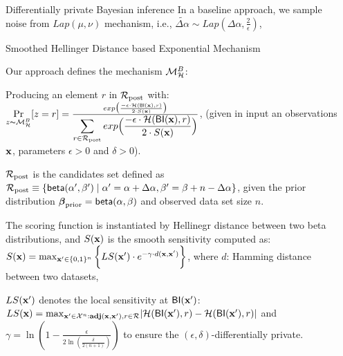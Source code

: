 \documentclass[final,hyperref={pdfpagelabels=false}]{beamer}
\begin{document}
\begin{frame}[t]
\begin{columns}[t]
\begin{column}{.485\textwidth}
\begin{block}{Differentially private Bayesian inference}
In a baseline approach, we sample noise from $Lap(\mu,\nu)$ mechanism, i.e., $\widetilde{\Delta \alpha}\sim Lap(\Delta \alpha, \frac{2}{\epsilon})$,

\end{block}



\begin{block}{Smoothed Hellinger Distance based Exponential Mechanism}

Our approach defines the mechanism $\mathcal{M}^{B}_{\mathcal{H}}$:

Producing an element $r$ in $\mathcal{R}_{\textup{post}}$ with:
$
\underset{z \thicksim \mathcal{M}^{B}_{\mathcal{H}}}{\Pr}[z=r] = 
\frac 
{exp\big(\frac{-\epsilon\cdot\mathcal{H}(\mathsf{BI}(\textbf{x}),r)}{2\cdot S(\textbf{x})}\big)}
{\displaystyle\sum_{r\in\mathcal{R}_{\textup{post}}} exp\Big(\frac{-\epsilon\cdot\mathcal{H}(\mathsf{BI}(\textbf{x}),r)}{2\cdot S(\textbf{x})}\Big)}
$,
(given in input an observations $\textbf{x}$, parameters $\epsilon>0$ and $\delta>0$).

$\mathcal{R}_{\textup{post}}$ is the candidates set defined as $ \mathcal{R}_{\textup{post}}\equiv\{\mathsf{beta}(\alpha',\beta')\mid \alpha'=\alpha+\Delta\alpha, \beta'=\beta+n-\Delta\alpha\}$, given the prior distribution $\boldsymbol{\beta}_{\textup{prior}}=\mathsf{beta}(\alpha, \beta)$ and observed data set size $n$.
 

The scoring function is instantiated by Hellinegr distance between two beta distributions, and $S(\textbf{x})$ is the smooth sensitivity computed as:
$
S(\textbf{x})=\max_{\textbf{x}' \in \{0,1\}^{n}}\bigg \{LS(\textbf{x}') \cdot e^{-\gamma\cdot d(\textbf{x},\textbf{x}')}\bigg\}
$,
where $d$: Hamming distance between two datasets, 

$LS(\textbf{x}')$ denotes the local sensitivity at $\mathsf{BI}(\textbf{x}')$:
$
LS(\textbf{x})=\max_{\textbf{x}' \in \mathcal{X}^n:\textbf{adj}(\textbf{x},\textbf{x}'), r\in \mathcal{R}}\lvert \mathcal{H}(\mathsf{BI}(\textbf{x}'), r) - \mathcal{H}(\mathsf{BI}(\textbf{x}'), r)\rvert
$ and 
$\gamma =
\ln(1 - \frac{\epsilon}{2 \ln (\frac{\delta}{2 (n + 1)})})$ to ensure the $(\epsilon,\delta)$-differentially private.


\end{block}


\end{column} %

\begin{column}{.01\textwidth}\end{column} %
 

\end{columns}
\end{frame}
\end{document}
